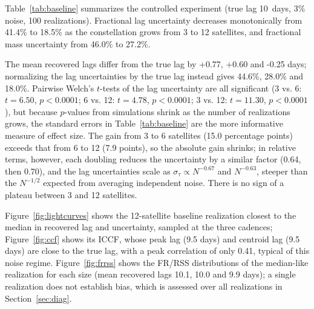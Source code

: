 \documentclass[11pt]{article}
\begin{document}
Table~\ref{tab:baseline} summarizes the controlled experiment (true lag 10~days, 3\% noise, 100 realizations). Fractional lag uncertainty decreases monotonically from 41.4\% to 18.5\% as the constellation grows from 3 to 12 satellites, and fractional mass uncertainty from 46.0\% to 27.2\%.

\begin{table}[htbp]
\centering
\small
\caption{Recovered lag and mass uncertainty by constellation size (true lag = 10.0 days; 100 realizations, 1200 MC trials per realization). SEM is the standard error of the mean lag uncertainty. Fractional lag error is the mean lag $\sigma$ divided by the mean recovered lag.}
\label{tab:baseline}
\end{table}

The mean recovered lags differ from the true lag by +0.77, +0.60 and -0.25 days; normalizing the lag uncertainties by the true lag instead gives 44.6\%, 28.0\% and 18.0\%. Pairwise Welch's $t$-tests of the lag uncertainty are all significant (3 vs. 6: $t=6.50$, $p<0.0001$; 6 vs. 12: $t=4.78$, $p<0.0001$; 3 vs. 12: $t=11.30$, $p<0.0001$), but because $p$-values from simulations shrink as the number of realizations grows, the standard errors in Table~\ref{tab:baseline} are the more informative measure of effect size. The gain from 3 to 6 satellites (15.0 percentage points) exceeds that from 6 to 12 (7.9 points), so the absolute gain shrinks; in relative terms, however, each doubling reduces the uncertainty by a similar factor (0.64, then 0.70), and the lag uncertainties scale as $\sigma_\tau \propto N^{-0.67}$ and $N^{-0.63}$, steeper than the $N^{-1/2}$ expected from averaging independent noise. There is no sign of a plateau between 3 and 12 satellites.

Figure~\ref{fig:lightcurves} shows the 12-satellite baseline realization closest to the median in recovered lag and uncertainty, sampled at the three cadences; Figure~\ref{fig:ccf} shows its ICCF, whose peak lag (9.5 days) and centroid lag (9.5 days) are close to the true lag, with a peak correlation of only 0.41, typical of this noise regime. Figure~\ref{fig:frrss} shows the FR/RSS distributions of the median-like realization for each size (mean recovered lags 10.1, 10.0 and 9.9 days); a single realization does not establish bias, which is assessed over all realizations in Section~\ref{sec:diag}.
\end{document}
